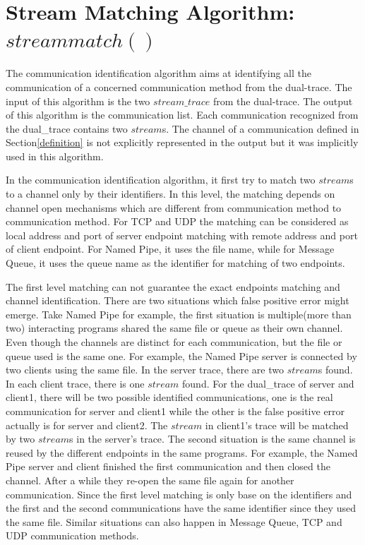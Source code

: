 \section{Stream Matching Algorithm: $streammatch()$}
The communication identification algorithm aims at identifying all the communication of a concerned communication method from the dual-trace. The input of this algorithm is the two $stream\_trace$ from the dual-trace. The output of this algorithm is the communication list. Each communication recognized from the dual\_trace contains two $stream$s. The channel of a communication defined in Section\ref{definition} is not explicitly represented in the output but it was implicitly used in this algorithm. 

In the communication identification algorithm, it first try to match two $stream$s to a channel only by their identifiers. In this level, the matching depends on channel open mechanisms which are different from communication method to communication method. For TCP and UDP the matching can be considered as local address and port of server endpoint matching with remote address and port of client endpoint. For Named Pipe, it uses the file name, while for Message Queue, it uses the queue name as the identifier for matching of two endpoints. 

The first level matching can not guarantee the exact endpoints matching and channel identification. There are two situations which false positive error might emerge. Take Named Pipe for example, the first situation is multiple(more than two) interacting programs shared the same file or queue as their own channel. Even though the channels are distinct for each communication, but the file or queue used is the same one. For example, the Named Pipe server is connected by two clients using the same file. In the server trace, there are two $stream$s found. In each client trace, there is one $stream$ found. For the dual\_trace of server and client1, there will be two possible identified communications, one is the real communication for server and client1 while the other is the false positive error actually is for server and client2. The $stream$ in client1's trace will be matched by two $stream$s in the server's trace. The second situation is the same channel is reused by the different endpoints in the same programs. For example, the Named Pipe server and client finished the first communication and then closed the channel. After a while they re-open the same file again for another communication. Since the first level matching is only base on the identifiers and the first and the second communications have the same identifier since they used the same file. Similar situations can also happen in Message Queue, TCP and UDP communication methods. 

